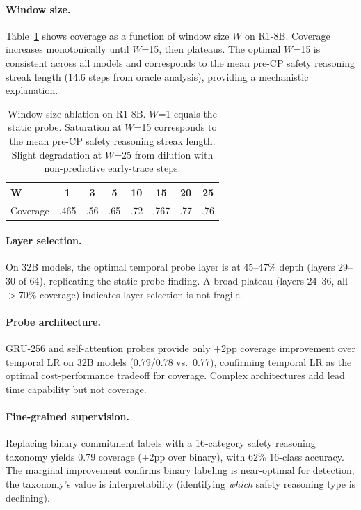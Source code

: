 \documentclass[11pt,a4paper]{article}
\begin{document}
\paragraph{Window size.} Table~\ref{tab:window} shows coverage as a function of window size $W$ on R1-8B. Coverage increases monotonically until $W$=15, then plateaus. The optimal $W$=15 is consistent across all models and corresponds to the mean pre-CP safety reasoning streak length (14.6 steps from oracle analysis), providing a mechanistic explanation.

\begin{table}[t]
\centering
\small
\begin{tabular}{lccccccc}
\toprule
\textbf{W} & 1 & 3 & 5 & 10 & 15 & 20 & 25 \\
\midrule
Coverage & .465 & .56 & .65 & .72 & .767 & .77 & .76 \\
\bottomrule
\end{tabular}
\caption{Window size ablation on R1-8B. $W$=1 equals the static probe. Saturation at $W$=15 corresponds to the mean pre-CP safety reasoning streak length. Slight degradation at $W$=25 from dilution with non-predictive early-trace steps.}
\label{tab:window}
\end{table}

\paragraph{Layer selection.} On 32B models, the optimal temporal probe layer is at 45--47\% depth (layers 29--30 of 64), replicating the static probe finding. A broad plateau (layers 24--36, all $>$70\% coverage) indicates layer selection is not fragile.

\paragraph{Probe architecture.} GRU-256 and self-attention probes provide only +2pp coverage improvement over temporal LR on 32B models (0.79/0.78 vs.\ 0.77), confirming temporal LR as the optimal cost-performance tradeoff for coverage. Complex architectures add lead time capability but not coverage.

\paragraph{Fine-grained supervision.} Replacing binary commitment labels with a 16-category safety reasoning taxonomy yields 0.79 coverage (+2pp over binary), with 62\% 16-class accuracy. The marginal improvement confirms binary labeling is near-optimal for detection; the taxonomy's value is interpretability (identifying \emph{which} safety reasoning type is declining).
\end{document}
